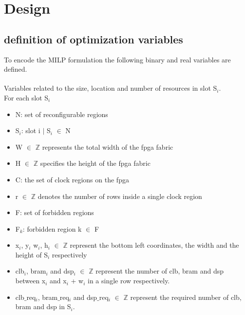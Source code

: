 \section{Design}
\subsection{definition of optimization variables}
To encode the MILP formulation the following binary and real variables are defined. \\ \\
Variables related to the size, location and number of resources in slot S$_i$. \\
For each slot S$_i$
\begin{itemize}
\item N: set of reconfigurable regions

\item S$_i$: slot i $\mid$ S$_i$ $\in$ N 

\item W $\in$ $\mathbb{Z}$ represents the total width of the fpga fabric

\item H $\in$ $\mathbb{Z}$ specifies the height of the fpga fabric

\item C: the set of clock regions on the fpga

\item r $\in$ $\mathbb{Z}$ denotes the number of rows inside a single clock region

\item F: set of forbidden regions

\item F$_k$: forbidden region k $\in$ F

\item x$_i$, y$_i$ w$_i$, h$_i$ $\in$ $\mathbb{Z}$ represent the bottom left coordinates, the width and the height of S$_i$  respectively
\end{itemize}

\begin{itemize}
\item clb$_i$, bram$_i$ and dsp$_i$  $\in$ $\mathbb{Z}$ represent the number of clb, bram and dsp between x$_i$ and x$_i$ + w$_i$ in a single row respectively.
\end{itemize}

\begin{itemize}
\item clb$\_$req$_i$, bram$\_$req$_i$ and dsp$\_$req$_i$ $\in$ $\mathbb{Z}$ represent the required number of clb, bram and dsp in S$_i$.
\end{itemize}


